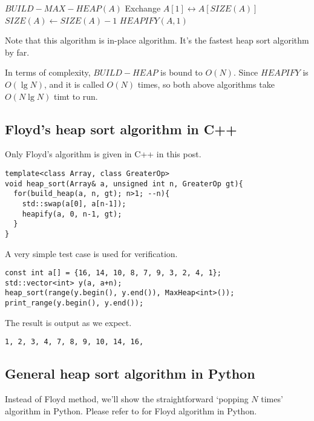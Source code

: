\documentclass{article}
\begin{document}
\begin{algorithmic}[1]
  \State $BUILD-MAX-HEAP(A)$
    \State Exchange $A[1] \leftrightarrow A[SIZE(A)]$
    \State $SIZE(A) \gets SIZE(A) - 1$
    \State $HEAPIFY(A, 1)$
  \EndWhile
\EndFunction
\end{algorithmic}

Note that this algorithm is in-place algorithm. It's the
fastest heap sort algorithm by far.

In terms of complexity, $BUILD-HEAP$ is bound to $O(N)$. 
Since $HEAPIFY$ is $O(\lg{N})$, and it
is called $O(N)$ times, so both above algorithms take $O(N \lg{N})$
timt to run.

\subsection*{Floyd's heap sort algorithm in C++}

Only Floyd's algorithm is given in C++ in this post. 

\lstset{language=C++}
\begin{lstlisting}
template<class Array, class GreaterOp>
void heap_sort(Array& a, unsigned int n, GreaterOp gt){
  for(build_heap(a, n, gt); n>1; --n){
    std::swap(a[0], a[n-1]);
    heapify(a, 0, n-1, gt);
  }
}
\end{lstlisting}

A very simple test case is used for verification.

\begin{lstlisting}
const int a[] = {16, 14, 10, 8, 7, 9, 3, 2, 4, 1};
std::vector<int> y(a, a+n);
heap_sort(range(y.begin(), y.end()), MaxHeap<int>());
print_range(y.begin(), y.end());
\end{lstlisting}

The result is output as we expect.

\begin{verbatim}
1, 2, 3, 4, 7, 8, 9, 10, 14, 16,
\end{verbatim}

\subsection*{General heap sort algorithm in Python}

Instead of Floyd method, we'll show the straightforward
`popping $N$ times' algorithm in Python. Please refer
to \cite{rosetta-heapsort} for Floyd algorithm in Python.
\end{document}
